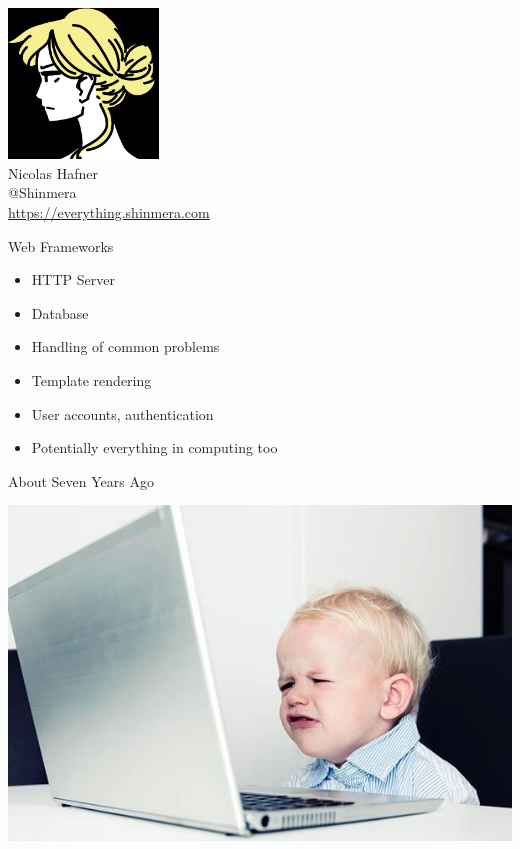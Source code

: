 \documentclass[14pt]{beamer}
\newcommand{\toptitle}[1]{
  {\huge #1} \\
  \vspace{0.2cm}
}
\begin{document}
\begin{frame}
  \begin{center}
    \includegraphics[height=4cm]{avatar.png}\\
    \vspace{0.2cm}
    {\Large Nicolas Hafner} \\
    \vspace{0.2cm}
    {\LARGE @Shinmera} \\
    \vspace{0.2cm}
    \url{https://everything.shinmera.com}
  \end{center}
\end{frame}

\begin{frame}
  \toptitle{Web Frameworks}
  \begin{itemize}
  \item HTTP Server
  \item Database
  \item Handling of common problems
  \item Template rendering
  \item User accounts, authentication
    \pause
  \item Potentially everything in computing too
  \end{itemize}
\end{frame}

\begin{frame}
  \toptitle{About Seven Years Ago}
  \begin{center}
    \includegraphics[width=0.8\columnwidth]{baby-at-computer.jpg}
  \end{center}
\end{frame}
\end{document}
